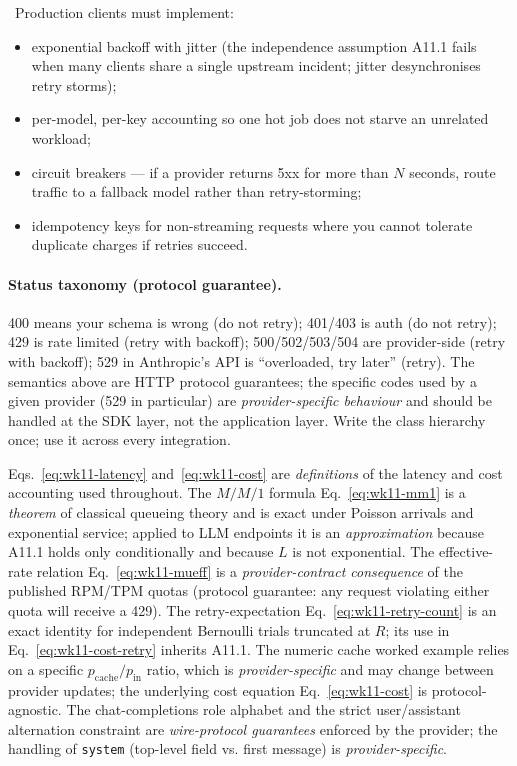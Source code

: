 \Cons\ Production clients must implement:
\begin{itemize}
  \item exponential backoff with jitter (the independence
        assumption A11.1 fails when many clients share a single
        upstream incident; jitter desynchronises retry storms);
  \item per-model, per-key accounting so one hot job does not
        starve an unrelated workload;
  \item circuit breakers --- if a provider returns 5xx for more
        than $N$ seconds, route traffic to a fallback model
        rather than retry-storming;
  \item idempotency keys for non-streaming requests where you
        cannot tolerate duplicate charges if retries succeed.
\end{itemize}

\paragraph{Status taxonomy (protocol guarantee).}
400 means your schema is wrong (do not retry);
401/403 is auth (do not retry); 429 is rate limited (retry with
backoff); 500/502/503/504 are provider-side (retry with
backoff); 529 in Anthropic's API is ``overloaded, try later''
(retry). The semantics above are HTTP protocol guarantees; the
specific codes used by a given provider (529 in particular) are
\emph{provider-specific behaviour} and should be handled at the
SDK layer, not the application layer. Write the class hierarchy
once; use it across every integration.

\begin{provedassumed}
Eqs.~\eqref{eq:wk11-latency} and~\eqref{eq:wk11-cost} are
\emph{definitions} of the latency and cost accounting used
throughout. The $M/M/1$ formula Eq.~\eqref{eq:wk11-mm1} is a
\emph{theorem} of classical queueing theory and is exact under
Poisson arrivals and exponential service; applied to LLM endpoints
it is an \emph{approximation} because A11.1 holds only
conditionally and because $L$ is not exponential. The
effective-rate relation Eq.~\eqref{eq:wk11-mueff} is a
\emph{provider-contract consequence} of the published RPM/TPM
quotas (protocol guarantee: any request violating either quota
will receive a 429). The retry-expectation
Eq.~\eqref{eq:wk11-retry-count} is an exact identity for
independent Bernoulli trials truncated at $R$; its use in
Eq.~\eqref{eq:wk11-cost-retry} inherits A11.1. The numeric
cache worked example relies on a specific
$p_\mathrm{cache}/p_\mathrm{in}$ ratio, which is
\emph{provider-specific} and may change between provider updates;
the underlying cost equation Eq.~\eqref{eq:wk11-cost} is protocol-
agnostic. The chat-completions role alphabet and the strict
user/assistant alternation constraint are \emph{wire-protocol
guarantees} enforced by the provider; the handling of
\texttt{system} (top-level field vs. first message) is
\emph{provider-specific}.
\end{provedassumed}

